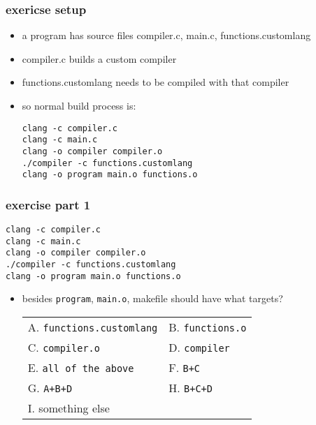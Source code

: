 \begin{FragileFrame}
\frametitle{exericse setup}
    \begin{itemize}
    \item a program has source files compiler.c, main.c, functions.customlang
    \item compiler.c builds a custom compiler
    \item functions.customlang needs to be compiled with that compiler
    \item so normal build process is:
\begin{Verbatim}[frame=single,fontsize=\fontsize{12}{13}]
clang -c compiler.c
clang -c main.c
clang -o compiler compiler.o
./compiler -c functions.customlang
clang -o program main.o functions.o
\end{Verbatim}
    \end{itemize}
\end{FragileFrame}

\begin{FragileFrame}
\frametitle{exercise part 1}
\begin{Verbatim}[frame=single,fontsize=\fontsize{13}{14}]
clang -c compiler.c
clang -c main.c
clang -o compiler compiler.o
./compiler -c functions.customlang
clang -o program main.o functions.o
\end{Verbatim}
    \begin{itemize}
    \item besides \texttt{program}, \texttt{main.o}, makefile should have what targets?
\begin{tabular}{ll}
    A. \texttt{functions.customlang} & B. \texttt{functions.o} \\
    C. \texttt{compiler.o} & D. \texttt{compiler} \\
    E. \texttt{all of the above} & F. \texttt{B+C} \\
    G. \texttt{A+B+D} & H. \texttt{B+C+D} \\
    I. something else 
\end{tabular}
    \end{itemize}
\end{FragileFrame}

